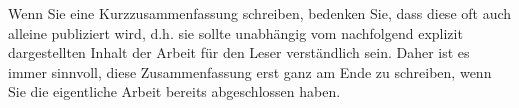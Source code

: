 \documentclass[11pt, a4paper]{article}
\begin{document}
\bigskip

Wenn Sie eine Kurzzusammenfassung schreiben, bedenken Sie, dass diese oft auch alleine publiziert wird, d.h. sie sollte unabhängig vom nachfolgend explizit dargestellten Inhalt der Arbeit für den Leser verständlich sein.
Daher ist es immer sinnvoll, diese Zusammenfassung erst ganz am Ende zu schreiben, wenn Sie die eigentliche Arbeit bereits abgeschlossen haben.

\newpage

\tableofcontents 

\newpage

 
\newpage

\newpage

\newpage

\newpage



\newpage




\end{document}
